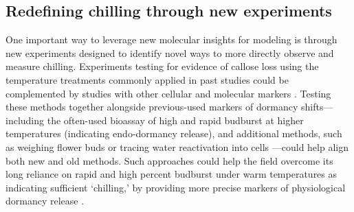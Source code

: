 \documentclass[11pt]{article}
\begin{document}
\subsection*{Redefining chilling through new experiments} 
One important way to leverage new molecular insights for modeling is through new experiments designed to identify novel ways to more directly observe and measure chilling. %
Experiments testing for evidence of callose loss using the temperature treatments commonly applied in past studies \citep{ospreebbms} could be complemented by studies with other cellular and molecular markers \citep{yu2024building}. Testing these methods together alongside previous-used markers of dormancy shifts---including the often-used bioassay of high and rapid budburst at higher temperatures (indicating endo-dormancy release), and additional methods, such as weighing flower buds \citep{chuine2016} or tracing water reactivation into cells \citep{faust1991bound,Kalcsits2009,walde2024stable}---could help align both new and old methods. Such approaches could help the field overcome its long reliance on rapid and high percent budburst under warm temperatures as indicating sufficient `chilling,' by providing more precise markers of physiological dormancy release \citep{fouche2023transport,walde2024stable}.
\end{document}
